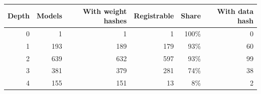 \begin{tabular}{rrrrrr}
\toprule
Depth & Models & With weight hashes & Registrable & Share & With data hash \\
\midrule
0 & 1 & 1 & 1 & 100\% & 0 \\
1 & 193 & 189 & 179 & 93\% & 60 \\
2 & 639 & 632 & 597 & 93\% & 99 \\
3 & 381 & 379 & 281 & 74\% & 38 \\
4 & 155 & 151 & 13 & 8\% & 2 \\
\bottomrule
\end{tabular}
